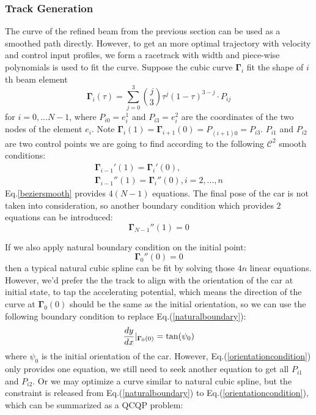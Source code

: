 \documentclass[conference, onecolumn]{IEEEtran}
\begin{document}
\subsubsection{Track Generation}\label{trackgeneration}
The curve of the refined beam from the previous section can be used as a smoothed path directly. However, to get an more optimal trajectory with velocity and control input profiles, we form a racetrack with width and piece-wise polynomials is used to fit the curve. Suppose the cubic curve $\mathbf{\Gamma}_i$ fit the shape of $i$th beam element\cite{prautzsch2002bezier}
\begin{equation}\label{cubic}
	\mathbf{\Gamma}_i(\tau)=\sum_{j = 0}^{3}\binom{j}{3}  \tau^j(1-\tau)^{3-j}\cdot P_{ij}
\end{equation}
for $i=0,...N-1$, where $P_{i0}=e^1_{i}$ and $P_{i3}=e^2_i$ are the coordinates of the two nodes of the element $e_i$. Note  $\mathbf{\Gamma}_{i}(1) =\mathbf{\Gamma}_{i+1}(0) = P_{(i+1)0}=P_{i3} $. $P_{i1}$ and $P_{i2}$ are two control points we are going to find according to the following $\mathcal{C} ^2$ smooth conditions\cite{phillips1996theory}:
\begin{equation}\label{beziersmooth}
	\begin{array}{l}
		\mathbf{\Gamma}_{i-1}'(1)=\mathbf{\Gamma}_{i}'(0), \\
		\mathbf{\Gamma}_{i-1}''(1)=\mathbf{\Gamma}_{i}''(0), i=2,...,n
	\end{array}	
\end{equation}
Eq.\ref{beziersmooth} provides $4(N-1)$ equations.
The final pose of the car is not taken into consideration, so another boundary condition which provides $2$ equations can be introduced:
\begin{equation}\label{naturalboundaryend}
	\mathbf{\Gamma}_{N-1}''(1)=0
\end{equation}


If we also apply natural boundary condition on the initial point:
\begin{equation}\label{naturalboundary}
	\mathbf{\Gamma}_{0}''(0)=0
\end{equation}
then a typical natural cubic spline can be fit by solving those $4n$ linear equations. However, we'd prefer the the track to align with the orientation of the car at initial state, to tap the accelerating potential, which means the direction of the curve at $\mathbf{\Gamma}_{0}(0)$ should be the same as the initial orientation, so we can use the following boundary condition to replace Eq.(\ref{naturalboundary}):
\begin{equation}\label{orientationcondition}
	\frac{dy}{dx} | _{\mathbf{\Gamma}_{0}(0)}=\tan(\psi_0)\\
\end{equation}
where $\psi_0$ is the initial orientation of the car.
However, Eq.(\ref{orientationcondition}) only provides one equation, we still need to seek another equation to get all $P_{i1}$ and $P_{i2}$. Or we may optimize a curve similar to natural cubic spline, but the constraint is released from Eq.(\ref{naturalboundary}) to Eq.(\ref{orientationcondition}), which can be summarized as a QCQP problem:
\end{document}
